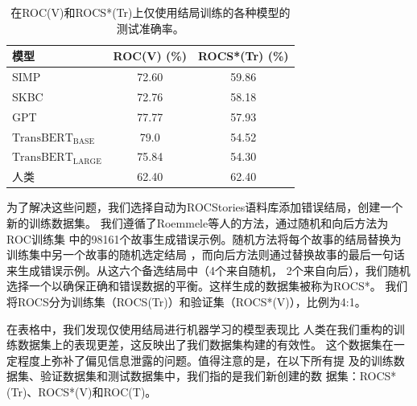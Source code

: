 \begin{table}
  \small
  \centering
  \begin{tabular}{lcc}
  \toprule
  \textbf{模型}& ROC(V) (\%) &ROCS*(Tr) (\%)\\
  \midrule
  SIMP& 72.60 &59.86\\
  SKBC&72.76&58.18\\
  GPT& 77.77 &57.93\\
  $\text{TransBERT}_{\text{BASE}}$&79.0&54.52\\
  $\text{TransBERT}_{\text{LARGE}}$&75.84&54.30\\
  \midrule
  人类& 62.40&62.40\\
  \bottomrule
  \end{tabular}
  \caption{在ROC(V)和ROCS*(Tr)上仅使用结局训练的各种模型的测试准确率。}
  \label{tab2:end}
  \end{table}


为了解决这些问题，我们选择自动为ROCStories语料库添加错误结局，创建一个新的训练数据集。
我们遵循了Roemmele等人\cite{roemmele2017rnn}的方法，通过随机和向后方法为ROC训练集
中的98161个故事生成错误示例。随机方法将每个故事的结局替换为训练集中另一个故事的随机选定结局
，而向后方法则通过替换故事的最后一句话来生成错误示例。从这六个备选结局中（4个来自随机，
2个来自向后），我们随机选择一个以确保正确和错误数据的平衡。这样生成的数据集被称为ROCS*。
我们将ROCS分为训练集（ROCS(Tr)）和验证集（ROCS*(V)），比例为4:1。

在表格中，我们发现仅使用结局进行机器学习的模型表现比
人类在我们重构的训练数据集上的表现更差，这反映出了我们数据集构建的有效性。
这个数据集在一定程度上弥补了偏见信息泄露的问题。值得注意的是，在以下所有提
及的训练数据集、验证数据集和测试数据集中，我们指的是我们新创建的数
据集：ROCS*(Tr)、ROCS*(V)和ROC(T)。

